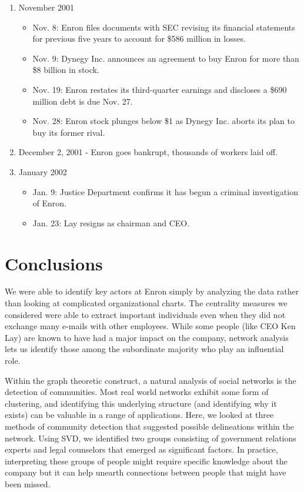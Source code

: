 \documentclass[12pt]{article}
\begin{document}
\begin{enumerate}
\item November 2001
\begin{itemize}
	\item Nov. 8: Enron files documents with SEC revising its financial statements for previous five years to account for \$586 million in losses.
	\item Nov. 9: Dynegy Inc. announces an agreement to buy Enron for more than \$8 billion in stock.
	\item Nov. 19: Enron restates its third-quarter earnings and discloses a \$690 million debt is due Nov. 27.
	\item Nov. 28: Enron stock plunges below \$1 as Dynegy Inc. aborts its plan to buy its former rival.
\end{itemize}

\item December 2, 2001 - Enron goes bankrupt, thousands of workers laid off.

\item January 2002
\begin{itemize}
	\item Jan. 9: Justice Department confirms it has begun a criminal investigation of Enron.
	\item Jan. 23: Lay resigns as chairman and CEO.
\end{itemize}

\end{enumerate}



\section{Conclusions}
	We were able to identify key actors at Enron simply by analyzing the data rather than looking at complicated organizational charts. The centrality measures we considered were able to extract important individuals even when they did not exchange many e-mails with other employees. While some people (like CEO Ken Lay) are known to have had a major impact on the company, network analysis lets us identify those among the subordinate majority who play an influential role.
	
	Within the graph theoretic construct, a natural analysis of social networks is the detection of communities. Most real world networks exhibit some form of clustering, and identifying this underlying structure (and identifying why it exists) can be valuable in a range of applications. Here, we looked at three methods of community detection that suggested possible delineations within the network. Using SVD, we identified two groups consisting of government relations experts and legal counselors that emerged as significant factors. In practice, interpreting these groups of people might require specific knowledge about the company but it can help unearth connections between people that might have been missed.
	
\end{document}
